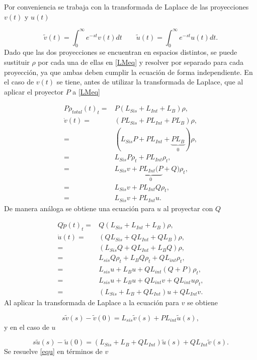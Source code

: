 \documentclass[a4paper,10pt]{report}
\begin{document}
Por conveniencia se trabaja con la transformada de Laplace \cite{ArfkenMM} de las proyecciones $v(t)$ y $u(t)$

\begin{equation}
\tilde{v}(t) = \int_0^\infty e^{-st}v(t)dt \qquad \tilde{u}(t) = \int_0^\infty e^{-st}u(t)dt.
\end{equation} Dado que las dos proyecciones se encuentran en espacios distintos, se puede sustituir $\rho$ por cada una de ellas en \eqref{LMeq} y resolver por separado para cada proyección, ya que ambas deben cumplir la ecuación de forma independiente. En el caso de $v(t)$ se tiene, antes de utilizar la transformada de Laplace, que al aplicar el proyector $P$ a \eqref{LMeq}

\begin{align*}
P\dot{\rho}_{total}(t)_t =& P(L_{Sis}+L_{Int}+L_B)\rho, \\
 \dot{v}(t) =& (PL_{Sis}+PL_{Int}+PL_B)\rho, \\
 =&(L_{Sis}P+PL_{Int}+\underbrace{PL_B}_0)\rho, \\
 =& L_{Sis}P\rho_t + PL_{Int}\rho_t, \\
 =& L_{Sis}v + \underbrace{PL_{Int}(P}_0+Q)\rho_t, \\
 =& L_{Sis}v + PL_{Int}Q\rho_t, \\
 =& L_{Sis}v + PL_{Int}u.
\end{align*} De manera análoga se obtiene una ecuación para $u$ al proyectar con $Q$

\begin{align*}
Q\dot{p}(t)_t =& Q(L_{Sis}+L_{Int}+L_B)\rho, \\
 \dot{u}(t) =& (QL_{Sis}+QL_{Int}+QL_B)\rho, \\
 =&(L_{Sis}Q+QL_{Int}+L_BQ)\rho, \\
 =& L_{sis}Q\rho_t + L_{B}Q\rho_t + QL_{int}\rho_t, \\
 =& L_{sis}u + L_{B}u + QL_{int}(Q+P)\rho_t,  \\
 =& L_{sis}u + L_{B}u + QL_{int}v+QL_{int}u\rho_t, \\
 =& (L_{Sis}+L_B+QL_{Int})u +QL_{Int}v. 
\end{align*} Al aplicar la transformada de Laplace a la ecuación para $v$ se obtiene

\begin{equation}\label{eqv}
s\tilde{v}(s)-\tilde{v}(0) = L_{sis}\tilde{v}(s) + PL_{int}\tilde{u}(s),
\end{equation} y en el caso de $u$

\begin{equation}\label{equ}
s\tilde{u}(s)-\tilde{u}(0) = (L_{Sis}+L_B+QL_{Int})\tilde{u}(s) + QL_{Int}\tilde{v}(s).
\end{equation} Se resuelve \eqref{equ} en términos de $v$
\end{document}
